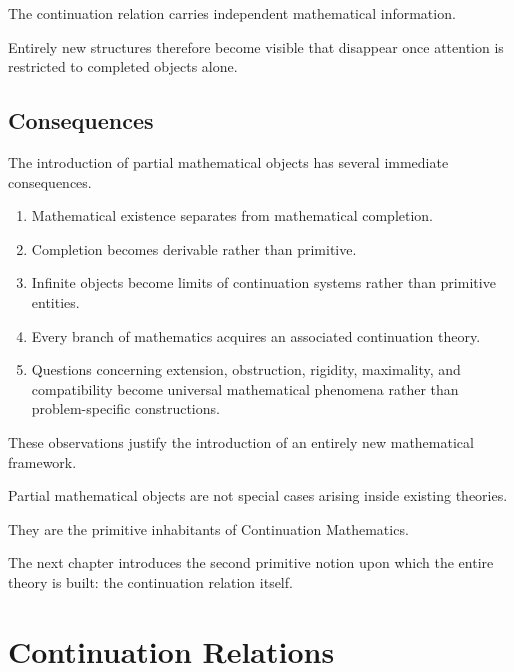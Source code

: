 \documentclass[13pt,openany]{book}
\theoremstyle{plain}
\theoremstyle{definition}
\begin{document}
The continuation relation carries independent mathematical information.

Entirely new structures therefore become visible that disappear once
attention is restricted to completed objects alone.

\section{Consequences}

The introduction of partial mathematical objects has several immediate
consequences.

\begin{enumerate}
\item Mathematical existence separates from mathematical completion.

\item Completion becomes derivable rather than primitive.

\item Infinite objects become limits of continuation systems rather than
primitive entities.

\item Every branch of mathematics acquires an associated continuation
theory.

\item Questions concerning extension, obstruction, rigidity, maximality,
and compatibility become universal mathematical phenomena rather than
problem-specific constructions.
\end{enumerate}

These observations justify the introduction of an entirely new
mathematical framework.

Partial mathematical objects are not special cases arising inside existing
theories.

They are the primitive inhabitants of Continuation Mathematics.

The next chapter introduces the second primitive notion upon which the
entire theory is built: the continuation relation itself.

\chapter{Continuation Relations}
\end{document}
